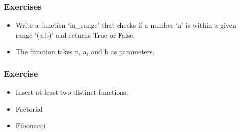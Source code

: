 \begin{frame}[fragile]\frametitle{Exercises}
    \begin{itemize}
    \item  Write a function `in\_range' that checks if a number `n' is within a given range `(a,b)' and returns True or False. 
    \item The function takes n, a, and b as parameters.
    \end{itemize}
\end{frame}

\begin{frame}[fragile]\frametitle{Exercise}
\begin{itemize}
\item Insert at least two distinct functions.
\item Factorial
\item Fibonacci
\end{itemize}
\end{frame}


